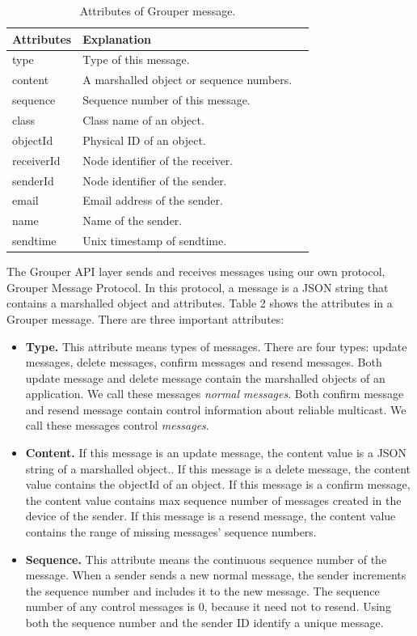 \documentclass[twocolumn,10pt]{article}
\begin{document}
\begin{table}[t]
	\centering
	\caption{Attributes of Grouper message.}
	\label{my-label}
	\begin{tabular}{lll}
		\hline
		\textbf{Attributes} & \textbf{Explanation} \\ \hline
		type & Type of this message. \\
		content & A marshalled object or sequence numbers. \\
		sequence & Sequence number of this message. \\
		class & Class name of an object. \\
		objectId & Physical ID of an object. \\
		receiverId & Node identifier of the receiver. \\
		senderId & Node identifier of the sender. \\
		email & Email address of the sender. \\
		name & Name of the sender. \\
		sendtime & Unix timestamp of sendtime. \\
		\hline
	\end{tabular}
\end{table}

The Grouper API layer sends and receives messages using our own protocol, Grouper Message Protocol.
In this protocol, a message is a JSON string that contains a marshalled object and attributes.
Table 2 shows the attributes in a Grouper message.
There are three important attributes:

\begin{itemize}
	\setlength{\itemsep}{1pt}
	\setlength{\parskip}{0pt}
	\setlength{\parsep}{0pt}
	\item \textbf{Type.}
	This attribute means types of messages.
	There are four types: update messages, delete messages, confirm messages and resend messages.
	Both update message and delete message contain the marshalled objects of an application.
	We call these messages \emph{normal messages}. 
	Both confirm message and resend message contain control information about reliable multicast. 
	We call these messages control \emph{messages}.
	\item \textbf{Content.} 
	If this message is an update message, the content value is a JSON string of a marshalled object..
	If this message is a delete message, the content value contains the objectId of an object.
	If this message is a confirm message, the content value contains max sequence number of messages created in the device of the sender.
	If this message is a resend message, the content value contains the range of missing messages' sequence numbers.
	\item \textbf{Sequence.}
	This attribute means the continuous sequence number of the message.
	When a sender sends a new normal message, the sender increments the sequence number and includes it to the new message.
	The sequence number of any control messages is 0, because it need not to resend.
	Using both the sequence number and the sender ID identify a unique message.
\end{itemize}
\end{document}
